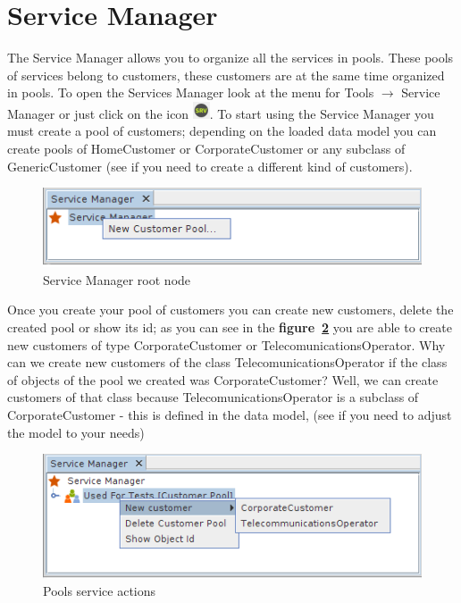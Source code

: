 \documentclass[a4paper]{article}
\begin{document}
	\clearpage
	\section{Service Manager} \label{sec:service_manager}
	
	The Service Manager allows you to organize all the services in pools. These pools of services belong to customers, these customers are at the same time organized in pools. To open the Services Manager look at the menu for Tools $\rightarrow$ Service Manager or just click on the icon \includegraphics[width=0.5cm]{img/icon_service_manager.png}.   
	To start using the Service Manager you must create a pool of customers; depending on the loaded data model you can create pools of HomeCustomer or CorporateCustomer or any subclass of GenericCustomer (see \textbf{} if you need to create a different kind of customers).  

	\begin{figure}[h!]
		\centering
		\includegraphics[width=0.6\linewidth]{img/sm_root_node.png}
		\caption{Service Manager root node}
		\label{fig:sm_root_node}
	\end{figure}

	Once you create your pool of customers you can create new customers, delete the created pool or show its id; as you can see in the \textbf{figure~\ref{fig:sm_pools_service_actions}} you are able to create new customers of type CorporateCustomer or TelecomunicationsOperator. Why can we create new customers of the class TelecomunicationsOperator if the class of objects of the pool we created was CorporateCustomer? Well, we can create customers of that class because TelecomunicationsOperator is a subclass of CorporateCustomer - this is defined in the data model, (see \textbf{} if you need to adjust the model to your needs)
	
	\begin{figure}[h!]
		\centering
		\includegraphics[width=0.6\linewidth]{img/sm_pools_service_actions.png}
		\caption{Pools service actions}
		\label{fig:sm_pools_service_actions}
	\end{figure}
    
\end{document}
